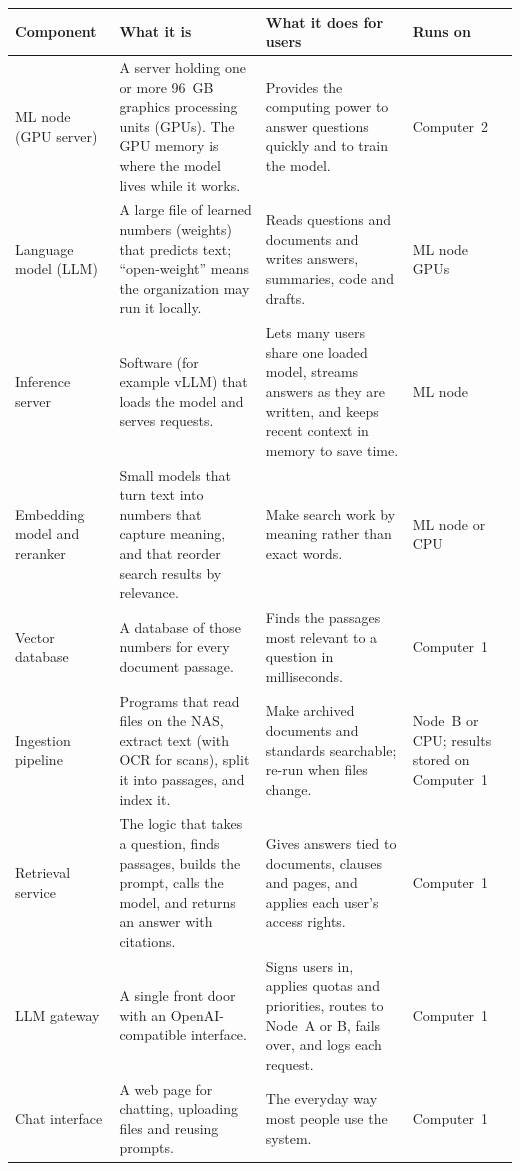 {\footnotesize
\begin{xltabular}{\textwidth}{@{}Y{0.8} Y{1.3} Y{1.2} Y{0.7}@{}}
  \toprule
  Component & What it is & What it does for users & Runs on \\
  \midrule
  \endhead
  ML node (GPU server) & A server holding one or more 96~GB graphics processing units (GPUs). The GPU memory is where the model lives while it works. & Provides the computing power to answer questions quickly and to train the model. & Computer~2 \\
  Language model (LLM) & A large file of learned numbers (weights) that predicts text; ``open-weight'' means the organization may run it locally. & Reads questions and documents and writes answers, summaries, code and drafts. & ML node GPUs \\
  Inference server & Software (for example vLLM) that loads the model and serves requests. & Lets many users share one loaded model, streams answers as they are written, and keeps recent context in memory to save time. & ML node \\
  Embedding model and reranker & Small models that turn text into numbers that capture meaning, and that reorder search results by relevance. & Make search work by meaning rather than exact words. & ML node or CPU \\
  Vector database & A database of those numbers for every document passage. & Finds the passages most relevant to a question in milliseconds. & Computer~1 \\
  Ingestion pipeline & Programs that read files on the NAS, extract text (with OCR for scans), split it into passages, and index it. & Make archived documents and standards searchable; re-run when files change. & Node~B or CPU; results stored on Computer~1 \\
  Retrieval service & The logic that takes a question, finds passages, builds the prompt, calls the model, and returns an answer with citations. & Gives answers tied to documents, clauses and pages, and applies each user's access rights. & Computer~1 \\
  LLM gateway & A single front door with an OpenAI-compatible interface. & Signs users in, applies quotas and priorities, routes to Node~A or B, fails over, and logs each request. & Computer~1 \\
  Chat interface & A web page for chatting, uploading files and reusing prompts. & The everyday way most people use the system. & Computer~1 \\

\end{xltabular}}
